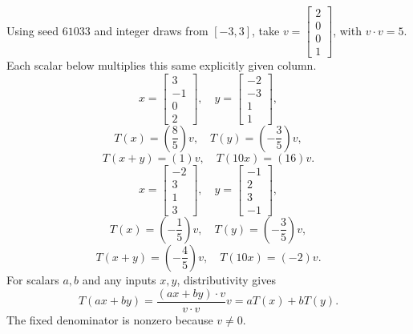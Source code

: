 Using seed $61033$ and integer draws from $[-3,3]$, take $v=\left[\begin{array}{r}2\\0\\0\\1\end{array}\right]$, with $v\cdot v=5$. Each scalar below multiplies this same explicitly given column.
\[x=\left[\begin{array}{r}3\\-1\\0\\2\end{array}\right],\quad y=\left[\begin{array}{r}-2\\-3\\1\\1\end{array}\right],\]
\[T(x)=(\frac{8}{5})v,\quad T(y)=(- \frac{3}{5})v,\]
\[T(x+y)=(1)v,\quad T(10x)=(16)v.\]
\[x=\left[\begin{array}{r}-2\\3\\1\\3\end{array}\right],\quad y=\left[\begin{array}{r}-1\\2\\3\\-1\end{array}\right],\]
\[T(x)=(- \frac{1}{5})v,\quad T(y)=(- \frac{3}{5})v,\]
\[T(x+y)=(- \frac{4}{5})v,\quad T(10x)=(-2)v.\]
For scalars $a,b$ and any inputs $x,y$, distributivity gives
\[T(ax+by)=\frac{(ax+by)\cdot v}{v\cdot v}v=aT(x)+bT(y).\]
The fixed denominator is nonzero because $v\ne0$.

